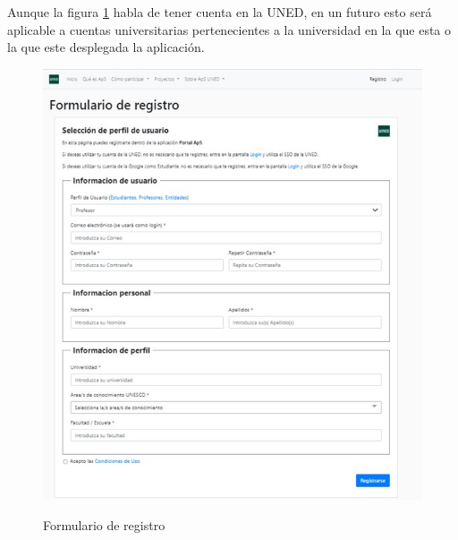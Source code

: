 \documentclass[11pt]{book}
\begin{document}
	Aunque la figura \ref{fig:registro} habla de tener cuenta en la UNED, en un futuro esto será aplicable a cuentas universitarias pertenecientes a la universidad en la que esta o la que este desplegada la aplicación.
	
	

	\begin{figure}[t]
		\centering
		\includegraphics[scale=0.9]{registro}
		\label{fig:registro}
		\caption{Formulario de registro}
	\end{figure}
\end{document}
